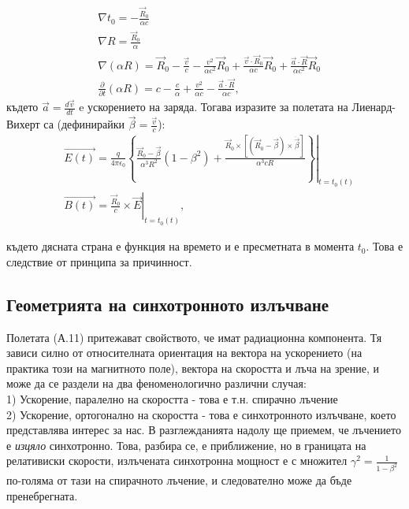 \begin{appendices}
\begin{equation}
		\begin{split}
			&\nabla t_0 = -\frac{\vec{R}_0}{\alpha c}\\
			&\nabla R = \frac{\vec{R}_0}{\alpha}\\
			&\nabla(\alpha R) = \vec{R}_0 - \frac{\vec{v}}{c} - \frac{v^2}{\alpha c^2}\vec{R}_0 + \frac{\vec{v}\cdot\vec{R}_0}{\alpha c}\vec{R}_0 + \frac{\vec{a}\cdot \vec{R}}{\alpha c^2} \vec{R}_0\\
			&\frac{\partial}{\partial t}(\alpha R) = c - \frac{c}{\alpha} + \frac{v^2}{\alpha c} - \frac{\vec{a}\cdot\vec{R}}{\alpha c},
		\end{split}
	\end{equation}
	където $\vec{a} = \frac{d \vec{v}}{dt}$ e ускорението на заряда. Тогава изразите за полетата на Лиенард-Вихерт са (дефинирайки $\vec{\beta} = \frac{\vec{v}}{c}$):
	\begin{equation}\label{LW_fields}
		\begin{split}
			&\vec{E(t)} =\left. \frac{q}{4\pi\epsilon_0}\left\{\frac{\vec{R}_0 - \vec{\beta}}{\alpha^3 R^2}\left(1 - \beta^2\right) + \frac{\vec{R}_0 \times \left[\left(\vec{R}_0 - \vec{\beta}\right)\times\dot{\vec{\beta}}\right]}{\alpha^3 c R}\right\}\right\vert_{t = t_0(t)}\\
			&\vec{B(t)} = \left. \frac{\vec{R}_0}{c}\times\vec{E}\right\vert_{t = t_0(t)},
		\end{split}
	\end{equation}
	
където дясната страна е функция на времето и е пресметната в момента $t_0$. Това е следствие от принципа за причинност. 
\subsection{Геометрията на синхотронното излъчване}	
Полетата (А.11) притежават свойството, че имат радиационна компонента. Тя зависи силно от относителната ориентация на вектора на ускорението (на практика този на магнитното поле), вектора на скоростта и лъча на зрение, и може да се раздели на два феноменологично различни случая:\\

1) Ускорение, паралелно на скоростта - това е т.н. спирачно лъчение\\

2) Ускорение, ортогонално на скоростта - това е синхотронното излъчване, което представлява интерес за нас. В разглежданията надолу ще приемем, че лъчението е \emph{изцяло} синхотронно. Това, разбира се, е приближение, но в границата на релативиски скорости, излъчената синхотронна мощност е с множител $\gamma^2 = \frac{1}{1 - \beta^2}$ по-голяма от тази на спирачното лъчение, и следователно може да бъде пренебрегната.\\


\end{appendices}
